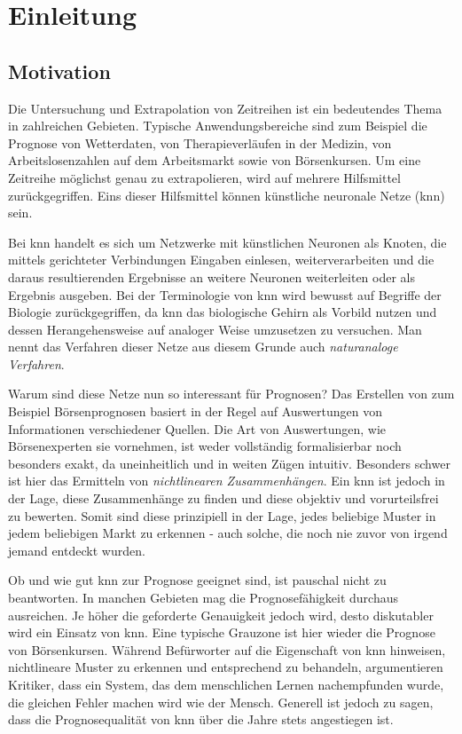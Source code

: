 \chapter{Einleitung}
\label{chapter:Einleitung}

\section{Motivation}
\label{section:Motivation}
Die Untersuchung und Extrapolation von Zeitreihen ist ein bedeutendes Thema in zahlreichen Gebieten. Typische Anwendungsbereiche sind zum Beispiel die Prognose von Wetterdaten, von Therapieverläufen in der  Medizin, von Arbeitslosenzahlen auf dem Arbeitsmarkt sowie von Börsenkursen. Um eine Zeitreihe möglichst genau zu extrapolieren, wird auf mehrere Hilfsmittel zurückgegriffen. Eins dieser Hilfsmittel können künstliche neuronale Netze (\acs{knn}) sein. 

Bei \acs{knn} handelt es sich um Netzwerke mit künstlichen Neuronen als Knoten, die mittels gerichteter Verbindungen Eingaben einlesen, weiterverarbeiten und die daraus resultierenden Ergebnisse an weitere Neuronen weiterleiten oder als Ergebnis ausgeben. Bei der Terminologie von \acs{knn} wird bewusst auf Begriffe der Biologie zurückgegriffen, da \acs{knn} das biologische Gehirn als Vorbild nutzen und dessen Herangehensweise auf analoger Weise umzusetzen zu versuchen. Man nennt das Verfahren dieser Netze aus diesem Grunde auch \textit{naturanaloge Verfahren}.

Warum sind diese Netze nun so interessant für Prognosen? Das Erstellen von zum Beispiel Börsenprognosen basiert in der Regel auf Auswertungen von Informationen verschiedener Quellen. Die Art von Auswertungen, wie Börsenexperten sie vornehmen, ist weder vollständig formalisierbar noch besonders exakt, da uneinheitlich und in weiten Zügen intuitiv. Besonders schwer ist hier das Ermitteln von \textit{nichtlinearen Zusammenhängen}. Ein \acs{knn} ist jedoch in der Lage, diese Zusammenhänge zu finden  und diese objektiv und vorurteilsfrei zu bewerten. Somit sind diese prinzipiell in der Lage, jedes beliebige Muster in jedem beliebigen Markt zu erkennen - auch solche, die noch nie zuvor von irgend jemand entdeckt wurden.

Ob und wie gut \acs{knn} zur Prognose geeignet sind, ist pauschal nicht zu beantworten. In manchen Gebieten mag die Prognosefähigkeit durchaus ausreichen. Je höher die geforderte Genauigkeit jedoch wird, desto diskutabler wird ein Einsatz von \acs{knn}. Eine typische Grauzone ist hier wieder die Prognose von Börsenkursen. Während Befürworter auf die Eigenschaft von \acs{knn} hinweisen, nichtlineare Muster zu erkennen und entsprechend zu behandeln, argumentieren Kritiker, dass ein System, das dem menschlichen Lernen nachempfunden wurde, die gleichen Fehler machen wird wie der Mensch. Generell ist jedoch zu sagen, dass die Prognosequalität von \acs{knn} über die Jahre stets angestiegen ist.

